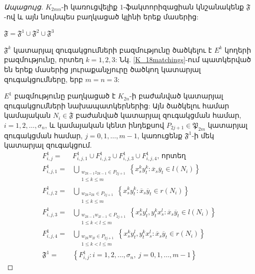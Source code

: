 \begin{hide}
\begin{proof}[Ապացույց]
$K_{2mn}$-ի կառուցվելիք $1$-ֆակտորիզացիան կնշանակենք $\mathfrak{F}$-ով և այն նույնպես բաղկացած կլինի երեք մասերից:

\begin{center}
$\mathfrak{F} = \mathfrak{F}^1 \cup \mathfrak{F}^2 \cup \mathfrak{F}^3$
\end{center}

$\mathfrak{F}^k$ կատարյալ զուգակցումների բազմությունը ծածկելու է $E^k$ կողերի բազմությունը, որտեղ $k=1,2,3$: Նկ. \ref{K_18matchings}-ում պատկերված են երեք մասերից յուրաքանչյուրը ծածկող կատարյալ զուգակցումները, երբ $m=n=3$:

$E^1$ բազմությունը բաղկացած է $K_{2n}$-ի բաժանված կատարյալ զուգակցումների նախապատկերներից: Այն ծածկելու համար կամայական $N_i \in \overline{\mathfrak{F}}$ բաժանված կատարյալ զուգակցման համար, $i=1,2,\ldots,\sigma_n$, և կամայական կենտ ինդեքսով $P_{2j+1} \in \mathfrak{P}_{2m}$ կատարյալ զուգակցման համար, $j=0,1,\ldots,m-1$, կառուցենք $\mathfrak{F}^1$-ի մեկ կատարյալ զուգակցում. 
\begin{align*}
F^1_{i,j} = &F^1_{i,j,1} \cup F^1_{i,j,2} \cup F^1_{i,j,3} \cup F^1_{i,j,4}\text{, որտեղ }\\
F^1_{i,j,1} = &\bigcup\limits_{\substack{w_{2k-1}z_{2k-1} \in P_{2j+1} \\ 1 \leq k \leq m}}
\left\{x_s^ky_t^k : \overline{x}_s\overline{y}_t \in l(N_i)\right\} \\
F^1_{i,j,2} = &\bigcup\limits_{\substack{w_{2k}z_{2k} \in P_{2j+1} \\ 1 \leq k \leq m}}
\left\{x_s^ky_t^k : \overline{x}_s\overline{y}_t \in r(N_i)\right\} \\
F^1_{i,j,3} = &\bigcup\limits_{\substack{w_{2k-1}w_{2l-1} \in P_{2j+1} \\ 1 \leq k < l \leq m}}
\left\{x_s^ky_t^l, y_t^kx_s^l : \overline{x}_s\overline{y}_t \in l(N_i)\right\} \\
F^1_{i,j,4} = &\bigcup\limits_{\substack{w_{2k}w_{2l} \in P_{2j+1} \\ 1 \leq k < l \leq m}}
\left\{x_s^ky_t^l, y_t^kx_s^l : \overline{x}_s\overline{y}_t \in r(N_i)\right\}\\
\mathfrak{F}^1 = &\left\{F^1_{i,j} : i=1,2,\ldots,\sigma_n,\ j=0,1,\ldots,m-1\right\}
\end{align*}


\end{proof}
\end{hide}

